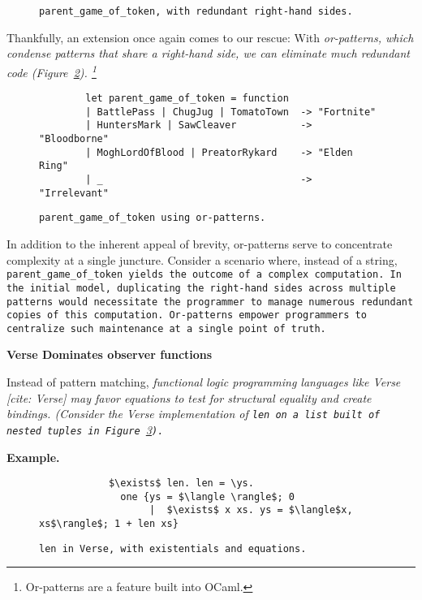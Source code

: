 \documentclass[manuscript,screen,review, 12pt]{acmart}
\begin{document}
\begin{outline}[enumerate]
\begin{figure}
        \caption{\tt{parent\_game\_of\_token}, with redundant right-hand sides.} 
        \label{fig:barepgot}
        \end{figure}

Thankfully, an extension once again comes to our rescue: With \it{or-patterns},
which condense patterns that share a right-hand side, we can eliminate much
redundant code (Figure~\ref{fig:orpgot}).
\footnote{Or-patterns are a feature built into OCaml.}

    \begin{figure}
    \begin{center}
    \begin{verbatim}
        let parent_game_of_token = function 
        | BattlePass | ChugJug | TomatoTown  -> "Fortnite"
        | HuntersMark | SawCleaver           -> "Bloodborne"
        | MoghLordOfBlood | PreatorRykard    -> "Elden Ring"
        | _                                  -> "Irrelevant"
    \end{verbatim}
    \end{center}    
    \caption{\tt{parent\_game\_of\_token} using or-patterns.} 
    \label{fig:orpgot}
    \end{figure}

    In addition to the inherent appeal of brevity, or-patterns serve to
    concentrate complexity at a single juncture. Consider a scenario where,
    instead of a string, \tt{parent\_game\_of\_token} yields the outcome of a
    complex computation. In the initial model, duplicating the right-hand sides
    across multiple patterns would necessitate the programmer to manage numerous
    redundant copies of this computation. Or-patterns empower programmers to
    centralize such maintenance at a single point of truth.
    
     \bf{Verse Dominates observer functions }

    Instead of pattern matching, \it{functional logic programming} languages
    like Verse [cite: Verse] may favor equations to test for structural equality
    and create bindings. (Consider the Verse implementation of \tt{len} on a
    list built of nested tuples in Figure~\ref{fig:verselen}).

     \bf{Example.}

    \begin{figure}
        \verselst
        \begin{lstlisting}
            $\exists$ len. len = \ys. 
              one {ys = $\langle \rangle$; 0
                   |  $\exists$ x xs. ys = $\langle$x, xs$\rangle$; 1 + len xs}
        \end{lstlisting}
    \caption{\tt{len} in Verse, with existentials and equations.} 
    \label{fig:verselen}
    \end{figure}
    

\end{outline}
\end{document}
